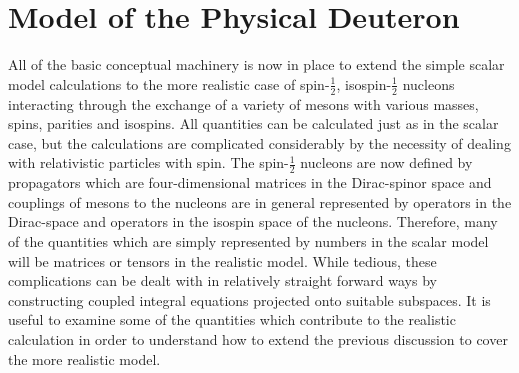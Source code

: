 \documentclass[mythesis.tex]{subfiles}
\begin{document}
\setcounter{chapter}{3}
\chapter{Model of the Physical Deuteron}

All of the basic conceptual machinery is now in place to extend the simple
scalar model calculations to the more realistic case of spin-$\frac{1}{2}$,
isospin-$\frac{1}{2}$
nucleons interacting through the exchange of a variety of mesons
with various masses, spins, parities and isospins. All quantities can be
calculated
just as in the scalar case, but the calculations are complicated considerably
by the necessity of dealing with relativistic particles with spin. The
spin-$\frac{1}{2}$ nucleons are now defined by propagators which are
four-dimensional matrices in the Dirac-spinor space and couplings of mesons
to the nucleons are in general represented by operators in the Dirac-space
and operators in the isospin space of the nucleons. Therefore, many of the
quantities which are simply represented by numbers in the scalar model
will be matrices or tensors in the realistic model. While tedious, these
complications can be dealt with in relatively straight forward ways by
constructing coupled integral equations projected onto suitable subspaces.
It is useful to examine some of the quantities which contribute to the
realistic calculation in order to understand how to extend the previous
discussion to cover the more realistic model.
\end{document}
